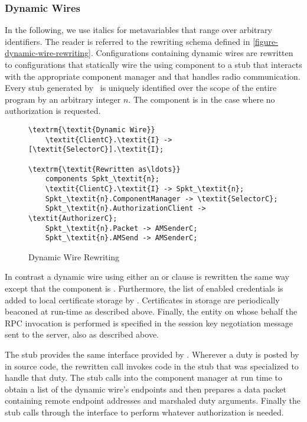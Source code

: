 \subsubsection{Dynamic Wires}

In the following, we use italics for metavariables that range over
arbitrary identifiers. The reader is referred to the rewriting schema
defined in \autoref{figure-dynamic-wire-rewriting}. Configurations
containing dynamic wires are rewritten to configurations that statically
wire the using component  to a stub
 that interacts with the appropriate component
manager  and that handles radio communication.
Every stub generated by \Sprocket\ is uniquely identified over the scope
of the entire program by an arbitrary integer $n$. The
 component is  in the case
where no authorization is requested.

\begin{figure}[!t]
\begin{textbox}{3.0in}
\begin{Verbatim}[commandchars=\\\{\}, fontsize=\small]
\textrm{\textit{Dynamic Wire}}
    \textit{ClientC}.\textit{I} -> [\textit{SelectorC}].\textit{I};

\textrm{\textit{Rewritten as\ldots}}
    components Spkt_\textit{n};
    \textit{ClientC}.\textit{I} -> Spkt_\textit{n};
    Spkt_\textit{n}.ComponentManager -> \textit{SelectorC};
    Spkt_\textit{n}.AuthorizationClient -> \textit{AuthorizerC};
    Spkt_\textit{n}.Packet -> AMSenderC;
    Spkt_\textit{n}.AMSend -> AMSenderC;
\end{Verbatim}
\end{textbox}
\caption{Dynamic Wire Rewriting}
\label{figure-dynamic-wire-rewriting}
\end{figure}

In contrast a dynamic wire using either an  or 
clause is rewritten the same way except that the
 component is . Furthermore, the
list of enabled credentials is added to local certificate storage by
\Sprocket. Certificates in storage are periodically beaconed at run-time
as described above. Finally, the entity on whose behalf the RPC
invocation is performed is specified in the session key negotiation
message sent to the server, also as described above.

The  stub provides the same interface provided by
. Wherever a duty is posted by
 in source code, the rewritten call invokes code
in the stub that was specialized to handle that duty. The stub calls
into the component manager at run time to obtain a list of the dynamic
wire's endpoints and then prepares a data packet containing remote
endpoint addresses and marshaled duty arguments. Finally the stub calls
through the  interface to perform whatever
authorization is needed.

